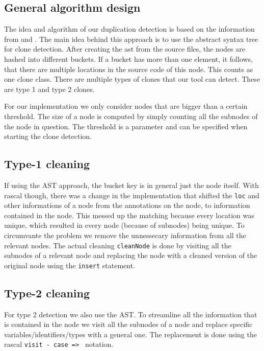 \documentclass{uva-inf-article}
\begin{document}
\subsection{General algorithm design}

The idea and algorithm of our duplication detection is based on the
information from \cite{lazar2014clone} and \cite{baxter1998clone}. 
The main idea behind this approach is to use the abstract syntax tree for clone detection.
After creating the ast from the source files,  the nodes are hashed into different buckets.
If a bucket has more than one element, it follows, that there are multiple locations in the source code of this node.
This counts as one clone class. There are multiple types of clones that our tool can detect.
These are type 1 and type 2 clones.

For our implementation we only consider nodes that are bigger than a certain threshold. The size of a node is computed by simply counting all the subnodes of the node in question. The threshold is a parameter and can be specified when starting the clone detection.

\subsection{Type-1 cleaning}

If using the AST approach, the bucket key is in general just the node itself. With rascal though, there was a change in the implementation
that shifted the \texttt{loc} and other informations of a node from the annotations on the node, to information contained in the node.
This messed up the matching because every location was unique, which resulted in every node (because of subnodes) being unique. 
To circumvante the problem we remove the unnessecary information from all the relevant nodes. The actual cleaning \texttt{cleanNode} is done
by visiting all the subnodes of a relevant node and replacing the node with a cleaned version of the original node using the \texttt{insert} statement.

\subsection{Type-2 cleaning}

For type 2 detection we also use the AST. To streamline all the information that is contained in the node we visit all the subnodes of a node
and replace specific variables/identifiers/types with a general one. The replacement is done using the rascal \texttt{visit - case => } notation.
\end{document}
